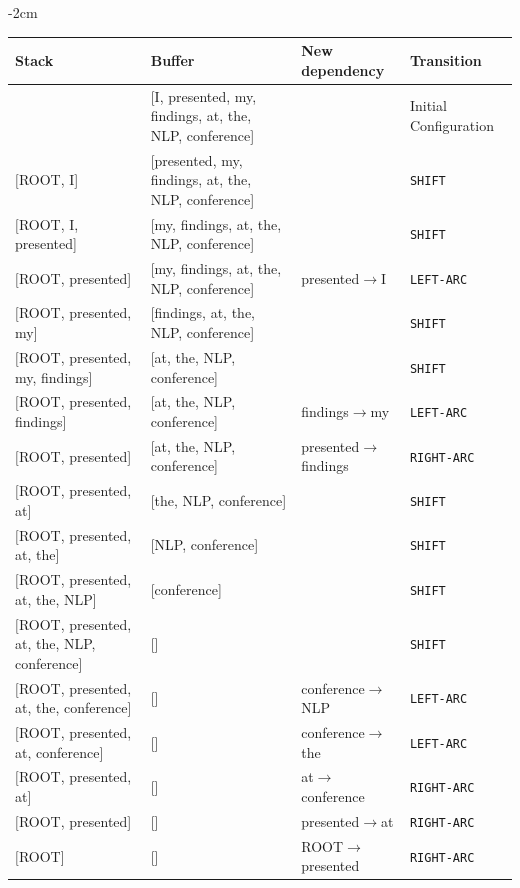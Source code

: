 \begin{parts}
    \begin{adjustwidth}{-2cm}{}
    \begin{tabular}{ l | l | l | l}
    Stack & Buffer & New dependency & Transition \\ \hline
    [ROOT] & [I, presented, my, findings, at, the, NLP, conference] &  & Initial Configuration \\
    $[$ROOT, I] & [presented, my, findings, at, the, NLP, conference] &  &  \texttt{SHIFT}  \\
    $[$ROOT, I, presented] & [my, findings, at, the, NLP, conference] &  &  \texttt{SHIFT}  \\
    $[$ROOT, presented] & [my, findings, at, the, NLP, conference] & presented$\to$I &  \texttt{LEFT-ARC}  \\
    $[$ROOT, presented, my] & [findings, at, the, NLP, conference] & & \texttt{SHIFT} \\
    $[$ROOT, presented, my, findings] & [at, the, NLP, conference] & & \texttt{SHIFT} \\
    $[$ROOT, presented, findings] & [at, the, NLP, conference] & findings$\to$my & \texttt{LEFT-ARC} \\
    $[$ROOT, presented] & [at, the, NLP, conference] & presented$\to$findings & \texttt{RIGHT-ARC} \\
    $[$ROOT, presented, at] & [the, NLP, conference] & & \texttt{SHIFT} \\
    $[$ROOT, presented, at, the] & [NLP, conference] & & \texttt{SHIFT} \\
    $[$ROOT, presented, at, the, NLP] & [conference] & & \texttt{SHIFT} \\
    $[$ROOT, presented, at, the, NLP, conference] & [] & & \texttt{SHIFT} \\
    $[$ROOT, presented, at, the, conference] & [] & conference$\to$NLP & \texttt{LEFT-ARC} \\
    $[$ROOT, presented, at, conference] & [] & conference$\to$the & \texttt{LEFT-ARC} \\
    $[$ROOT, presented, at] & [] & at$\to$conference & \texttt{RIGHT-ARC} \\
    $[$ROOT, presented] & [] & presented$\to$at & \texttt{RIGHT-ARC} \\
    $[$ROOT] & [] & ROOT$\to$presented & \texttt{RIGHT-ARC} \\
    \end{tabular}\newline
    \end{adjustwidth}
    

\end{parts}

